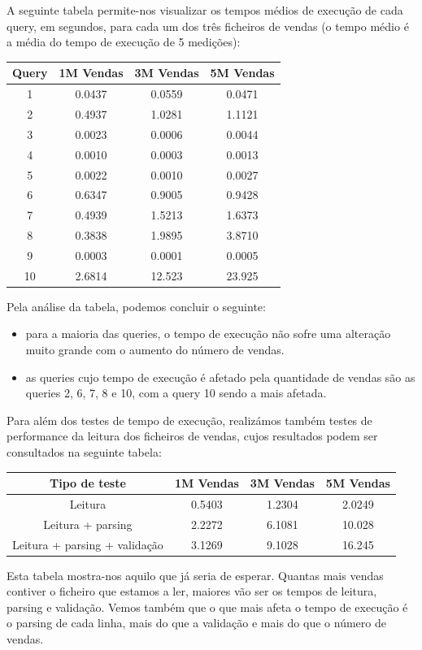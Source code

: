 \documentclass[a4paper]{report}
\begin{document}
	A seguinte tabela permite-nos visualizar os tempos médios de execução de cada query, em segundos, para cada um dos três ficheiros de vendas (o tempo médio é a média do tempo de execução de 5 medições):
	\begin{center}
	\begin{tabular}[pos]{| c | c | c | c |}
		\hline
		Query & 1M Vendas & 3M Vendas & 5M Vendas \\ \hline
		1 & 0.0437 & 0.0559 & 0.0471\\ \hline
		2 & 0.4937 & 1.0281 & 1.1121\\ \hline
		3 & 0.0023 & 0.0006 & 0.0044\\ \hline
		4 & 0.0010 & 0.0003 & 0.0013\\ \hline
		5 & 0.0022 & 0.0010 & 0.0027\\ \hline
		6 & 0.6347 & 0.9005 & 0.9428\\ \hline
		7 & 0.4939 & 1.5213 & 1.6373\\ \hline
		8 & 0.3838 & 1.9895 & 3.8710\\ \hline
		9 & 0.0003 & 0.0001 & 0.0005\\ \hline
		10 & 2.6814 & 12.523 & 23.925\\ \hline
	\end{tabular}
	\end{center}

	Pela análise da tabela, podemos concluir o seguinte:
	\begin{itemize}

		\item para a maioria das queries, o tempo de execução não sofre uma alteração muito grande com o aumento do número de vendas.

		\item as queries cujo tempo de execução é afetado pela quantidade de vendas são as queries 2, 6, 7, 8 e 10, com a query 10 sendo a mais afetada.
		
	\end{itemize}

	Para além dos testes de tempo de execução, realizámos também testes de performance da leitura dos ficheiros de vendas, cujos resultados podem ser consultados na seguinte tabela:
	\begin{center}
	\begin{tabular}[pos]{| c | c | c | c |}
		\hline
		Tipo de teste & 1M Vendas & 3M Vendas & 5M Vendas \\ \hline
		Leitura & 0.5403 & 1.2304 & 2.0249\\ \hline
		Leitura + parsing & 2.2272 & 6.1081 & 10.028\\ \hline
		Leitura + parsing + validação & 3.1269 & 9.1028 & 16.245\\ \hline
	\end{tabular}
	\end{center}
	Esta tabela mostra-nos aquilo que já seria de esperar. Quantas mais vendas contiver o ficheiro que estamos a ler, maiores vão ser os tempos de leitura, parsing e validação. Vemos também que o que mais afeta o tempo de execução é o parsing de cada linha, mais do que a validação e mais do que o número de vendas.
\end{document}
